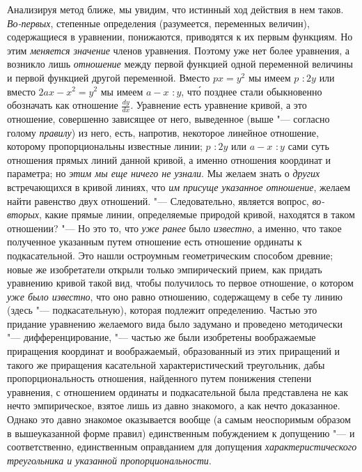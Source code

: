 Анализируя метод ближе, мы увидим, что истинный ход действия в нем таков.
{\em Во-первых}, степенные определения (разумеется,
переменных величин), содержащиеся в уравнении, понижаются, приводятся к их
первым функциям. Но этим {\em меняется значение} членов
уравнения. Поэтому уже нет более уравнения, а возникло лишь
{\em отношение} между первой функцией одной переменной
величины и первой функцией другой переменной. Вместо $px=y^2$ мы
имеем $p \text{~}\colon 2y$ или вместо $2ax-x^2=y^2$ мы имеем
$a-x \text{~}\colon y$, чт\'{о} позднее стали обыкновенно обозначать
как отношение $\frac{dy}{dx}$. Уравнение есть уравнение
кривой, а это отношение, совершенно зависящее от него, выведенное (выше
"--- согласно голому {\em правилу}) из него, есть,
напротив, некоторое линейное отношение, которому пропорциональны известные
линии; $p \text{~}\colon 2y$ или $a-x \text{~}\colon y$ сами
суть отношения прямых линий данной кривой, а именно отношения координат и
параметра; но {\em этим мы еще ничего не узнали}. Мы желаем знать о
{\em других} встречающихся в кривой линиях, что
{\em им присуще указанное отношение}, желаем найти
равенство двух отношений. "--- Следовательно, является вопрос,
{\em во-вторых}, какие прямые линии, определяемые
природой кривой, находятся в таком отношении? "--- Но это то, что
{\em уже ранее} было {\em известно}, а именно, что такое полученное
указанным путем отношение есть отношение ординаты к подкасательной. Это
нашли остроумным геометрическим способом древние; новые же изобретатели
открыли только эмпирический прием, как придать уравнению кривой такой вид,
чтобы получилось то первое отношение, о котором
{\em уже было известно}, что оно равно отношению,
содержащему в себе ту линию (здесь "--- подкасательную), которая подлежит
определению. Частью это придание уравнению желаемого вида было задумано и
проведено методически "--- дифференцирование, "--- частью же были изобретены
воображаемые приращения координат и воображаемый, образованный из этих
приращений и такого же приращения касательной характеристический
треугольник, дабы пропорциональность отношения, найденного путем понижения
степени уравнения, с отношением ординаты и подкасательной была представлена
не как нечто эмпирическое, взятое лишь из давно знакомого, а как нечто
доказанное. Однако это давно знакомое оказывается вообще (а самым
неоспоримым образом в вышеуказанной форме правил) единственным побуждением
к допущению "--- и соответственно, единственным оправданием для допущения
{\em характеристического треугольника и указанной
пропорциональности}.

